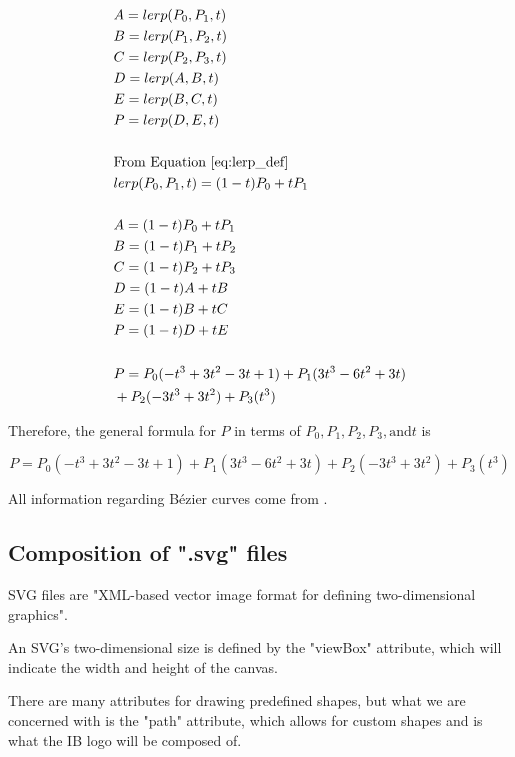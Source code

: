 \documentclass[letterpaper, 12pt]{article}
\begin{document}
\begingroup
\allowdisplaybreaks
\begin{align*}
     & A = lerp(P_0, P_1, t)
    \\
     & B = lerp(P_1, P_2, t)
    \\
     & C = lerp(P_2, P_3, t)
    \\
     & D = lerp(A, B, t)
    \\
     & E = lerp(B, C, t)
    \\
     & P = lerp(D, E, t)
    \\
    \\
     & \text{From Equation } \protect\ref*{eq:lerp_def}
    \\
     & lerp(P_0, P_1, t) = (1-t)P_0 + tP_1
    \\
    \\
     & A = (1-t)P_0 + tP_1
    \\
     & B = (1-t)P_1 + tP_2
    \\
     & C = (1-t)P_2 + tP_3
    \\
     & D = (1-t)A + tB
    \\
     & E = (1-t)B + tC
    \\
     & P = (1-t)D + tE
    \\
    \\
     & P = P_0(-t^3+3t^2-3t+1) + P_1(3t^3-6t^2+3t)
    \\
     & + P_2(-3t^3+3t^2) + P_3(t^3)
\end{align*}
\endgroup

Therefore, the general formula for \(P\) in terms of
\(P_0, P_1, P_2, P_3, \text{and} t\) is

\begin{equation} \label{eq:pFormula}
    P = P_0(-t^3+3t^2-3t+1) + P_1(3t^3-6t^2+3t) + P_2(-3t^3+3t^2) + P_3(t^3)
\end{equation}

All information regarding Bézier curves come from \cite{holmerBeautyBezierCurves2021}.

\subsection{Composition of ".svg" files}

SVG files are "XML-based vector image format for defining two-dimensional
graphics"\cite{SVG2023}.

An SVG's two-dimensional size is defined by the "viewBox" attribute,
which will indicate the width and height of the canvas.

There are many attributes for drawing predefined shapes, but what
we are concerned with is the "path" attribute, which allows for custom
shapes and is what the IB logo will be composed of.
\end{document}
